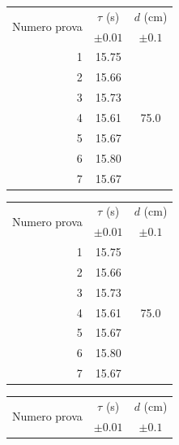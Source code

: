 \documentclass{article}
\begin{document}
\begin{table}[h!]
	\hspace{-0.1\textwidth}	
	\begin{minipage}{0.1\textwidth}
			\begin{tabular}{ | r | c | c | }
    				\hline
    				\multirow{2}{5em}{Numero prova} & $\tau$ (s) & $d$ (cm) \\
    				& $\pm 0.01$ & $\pm 0.1$ \\
    				\hline
    				1 & 15.75 & \multirow{7}{*}{75.0} \\ \cline{1-2}
    				2 & 15.66 & \\ \cline{1-2}
    				3 & 15.73 & \\ \cline{1-2}
    				4 & 15.61 & \\ \cline{1-2}
    				5 & 15.67 & \\ \cline{1-2}
    				6 & 15.80 & \\ \cline{1-2}
    				7 & 15.67 & \\ \cline{1-2}
    				\hline
			\end{tabular}
	\end{minipage}
	\hspace{0.3\textwidth}
	\begin{minipage}{0.1\textwidth}
			\begin{tabular}{ | r | c | c | }
    				\hline
    				\multirow{2}{5em}{Numero prova} & $\tau$ (s) & $d$ (cm) \\
    				& $\pm 0.01$ & $\pm 0.1$ \\
    				\hline
    				1 & 15.75 & \multirow{7}{*}{75.0} \\ \cline{1-2}
    				2 & 15.66 & \\ \cline{1-2}
    				3 & 15.73 & \\ \cline{1-2}
    				4 & 15.61 & \\ \cline{1-2}
    				5 & 15.67 & \\ \cline{1-2}
    				6 & 15.80 & \\ \cline{1-2}
    				7 & 15.67 & \\ \cline{1-2}
    				\hline
			\end{tabular}
	\end{minipage}
	\hspace{0.3\textwidth}
	\begin{minipage}{0.1\textwidth}
			\begin{tabular}{ | r | c | c | }
    				\hline
    				\multirow{2}{5em}{Numero prova} & $\tau$ (s) & $d$ (cm) \\
    				& $\pm 0.01$ & $\pm 0.1$ \\

\end{tabular}
\end{minipage}
\end{table}
\end{document}
